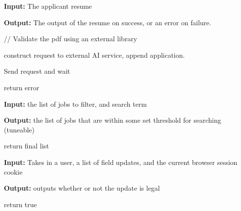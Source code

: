 \documentclass{article}
\begin{document}
\begin{algorithm}
\caption{The \textbf{requestAIReview()} function}
\textbf{Input:} The applicant resume

\textbf{Output:} The output of the resume on success, or an error on failure.

// Validate the pdf using an external library


construct request to external AI service, append application.

Send request and wait

\Else
{
    return error
}
\end{algorithm}

\begin{algorithm}
\caption{The \textbf{filterJobsByName()} function}
\textbf{Input:} the list of jobs to filter, and search term

\textbf{Output:} the list of jobs that are within some set threshold for searching (tuneable)


return final list

\end{algorithm}

\begin{algorithm}
\caption{The \textbf{validateUserProfileUpdate()} function}
\textbf{Input:} Takes in a user, a list of field updates, and the current browser session cookie

\textbf{Output:} outputs whether or not the update is legal


return true
\end{algorithm}
\end{document}
